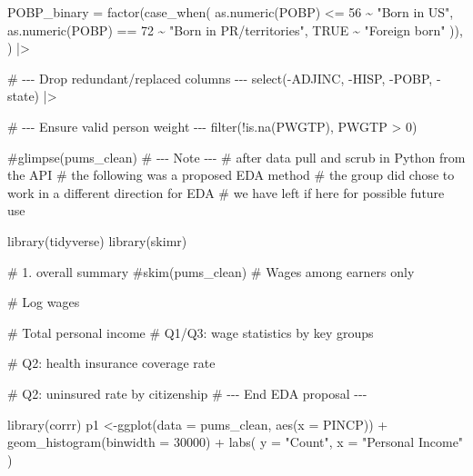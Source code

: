 \documentclass[
  letterpaper,
  DIV=11,
  numbers=noendperiod]{scrartcl}
\newenvironment{Shaded}{\begin{snugshade}}{\end{snugshade}}
\newcommand{\AttributeTok}[1]{\textcolor[rgb]{0.40,0.45,0.13}{#1}}
\newcommand{\CommentTok}[1]{\textcolor[rgb]{0.37,0.37,0.37}{#1}}
\newcommand{\ConstantTok}[1]{\textcolor[rgb]{0.56,0.35,0.01}{#1}}
\newcommand{\DecValTok}[1]{\textcolor[rgb]{0.68,0.00,0.00}{#1}}
\newcommand{\FunctionTok}[1]{\textcolor[rgb]{0.28,0.35,0.67}{#1}}
\newcommand{\NormalTok}[1]{\textcolor[rgb]{0.00,0.23,0.31}{#1}}
\newcommand{\OtherTok}[1]{\textcolor[rgb]{0.00,0.23,0.31}{#1}}
\newcommand{\SpecialCharTok}[1]{\textcolor[rgb]{0.37,0.37,0.37}{#1}}
\newcommand{\StringTok}[1]{\textcolor[rgb]{0.13,0.47,0.30}{#1}}
\begin{document}
\begin{Shaded}
\begin{Highlighting}[]
    \AttributeTok{POBP\_binary =} \FunctionTok{factor}\NormalTok{(}\FunctionTok{case\_when}\NormalTok{(}
      \FunctionTok{as.numeric}\NormalTok{(POBP) }\SpecialCharTok{\textless{}=} \DecValTok{56}  \SpecialCharTok{\textasciitilde{}} \StringTok{"Born in US"}\NormalTok{,}
      \FunctionTok{as.numeric}\NormalTok{(POBP) }\SpecialCharTok{==} \DecValTok{72}  \SpecialCharTok{\textasciitilde{}} \StringTok{"Born in PR/territories"}\NormalTok{,}
      \ConstantTok{TRUE}                    \SpecialCharTok{\textasciitilde{}} \StringTok{"Foreign born"}
\NormalTok{    )),}
\NormalTok{  ) }\SpecialCharTok{|\textgreater{}}

  \CommentTok{\# {-}{-}{-} Drop redundant/replaced columns {-}{-}{-}}
  \FunctionTok{select}\NormalTok{(}\SpecialCharTok{{-}}\NormalTok{ADJINC, }\SpecialCharTok{{-}}\NormalTok{HISP, }\SpecialCharTok{{-}}\NormalTok{POBP, }\SpecialCharTok{{-}}\NormalTok{state) }\SpecialCharTok{|\textgreater{}}

  \CommentTok{\# {-}{-}{-} Ensure valid person weight {-}{-}{-}}
  \FunctionTok{filter}\NormalTok{(}\SpecialCharTok{!}\FunctionTok{is.na}\NormalTok{(PWGTP), PWGTP }\SpecialCharTok{\textgreater{}} \DecValTok{0}\NormalTok{)}

\CommentTok{\#glimpse(pums\_clean)}
\CommentTok{\# {-}{-}{-} Note {-}{-}{-}}
\CommentTok{\# after data pull and scrub in Python from the API}
\CommentTok{\# the following was a proposed EDA method}
\CommentTok{\# the group did chose to work in a different direction for EDA}
\CommentTok{\# we have left if here for possible future use}

\FunctionTok{library}\NormalTok{(tidyverse)}
\FunctionTok{library}\NormalTok{(skimr)}

\CommentTok{\# 1. overall summary}
\CommentTok{\#skim(pums\_clean)}
\CommentTok{\# Wages among earners only}

\CommentTok{\# Log wages}

\CommentTok{\# Total personal income}
\CommentTok{\# Q1/Q3: wage statistics by key groups}

\CommentTok{\# Q2: health insurance coverage rate}

\CommentTok{\# Q2: uninsured rate by citizenship}
\CommentTok{\# {-}{-}{-} End EDA proposal {-}{-}{-}}

\FunctionTok{library}\NormalTok{(corrr)}
\NormalTok{p1 }\OtherTok{\textless{}{-}}\FunctionTok{ggplot}\NormalTok{(}\AttributeTok{data =}\NormalTok{ pums\_clean, }\FunctionTok{aes}\NormalTok{(}\AttributeTok{x =}\NormalTok{ PINCP)) }\SpecialCharTok{+}
  \FunctionTok{geom\_histogram}\NormalTok{(}\AttributeTok{binwidth =} \DecValTok{30000}\NormalTok{) }\SpecialCharTok{+} 
  \FunctionTok{labs}\NormalTok{(}
    \AttributeTok{y =} \StringTok{"Count"}\NormalTok{,}
    \AttributeTok{x =} \StringTok{"Personal Income"}
\NormalTok{  )}



\end{Highlighting}
\end{Shaded}
\end{document}
